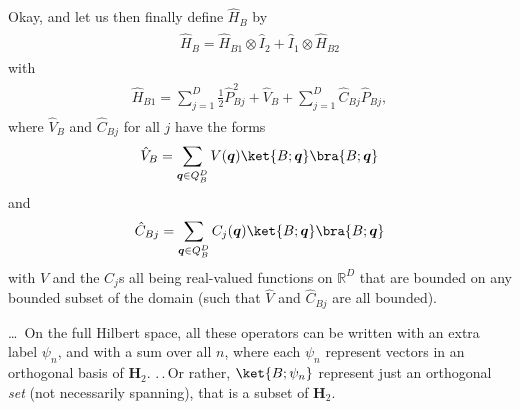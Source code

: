 \documentclass{report}
\begin{document}
Okay, and let us then finally define $\hat H_B$ by
\begin{align}
\begin{aligned}
	\hat H_B = \hat H_{B1} \otimes \hat I_2 + \hat I_1 \otimes \hat H_{B2}
	\label{H_B_01}
\end{aligned}
\end{align} 
with
\begin{align}
\begin{aligned}
	\hat H_{B1} =  
		\sum_{j=1}^D \frac{1}{2} \hat P_{B j}^2 + 
		\hat V_B + 
		\sum_{j=1}^D \hat C_{B j} \hat P_{B j},
	\label{H_B1_01}
\end{aligned}
\end{align} 
where $\hat V_B$ and $\hat C_{B j}$ for all $j$ have the forms
\begin{align}
\begin{aligned}
	\hat V_B = \sum_{\boldsymbol{q} \in Q_{B}^D} 
		V(\boldsymbol{q}) \ket{B; \boldsymbol{q}} \bra{B; \boldsymbol{q}}
	\label{V_B_01}
\end{aligned}
\end{align} 
and
\begin{align}
\begin{aligned}
	\hat C_{B j} = \sum_{\boldsymbol{q} \in Q_{B}^D} 
		C_{j}(\boldsymbol{q}) \ket{B; \boldsymbol{q}} \bra{B; \boldsymbol{q}}
	\label{Cj_B_01}
\end{aligned}
\end{align} 
with $V$ and the $C_j$s all being %
real-valued functions on $\mathbb{R}^D$ that are bounded on any bounded subset of the domain (such that $\hat V$ and $\hat C_{B j}$ are all bounded). 

\ldots\ On the full Hilbert space, all these operators can be written with an extra label $\psi_n$, and with a sum over all $n$, where each $\psi_n$ represent vectors in an orthogonal basis of $\textbf{H}_2$. .\,.\,Or rather, $\ket{B; \psi_n}$ represent just an orthogonal \emph{set} (not necessarily spanning), that is a subset of $\textbf{H}_2$.
\end{document}
